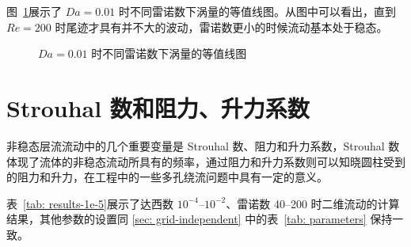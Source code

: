图~\ref{fig: vorticity-contour-1e-2}展示了 $Da=0.01$ 时不同雷诺数下涡量的等值线图。从图中可以看出，直到 $Re=200$ 时尾迹才具有并不大的波动，雷诺数更小的时候流动基本处于稳态。

\begin{figure}
	\centering
	\begin{minipage}{\textwidth}
		\centering
	\end{minipage}
	\centering
	\begin{minipage}{\textwidth}
		\centering
	\end{minipage}
	\caption{$Da=0.01$ 时不同雷诺数下涡量的等值线图}
	\label{fig: vorticity-contour-1e-2}
\end{figure}

\section{Strouhal 数和阻力、升力系数}

非稳态层流流动中的几个重要变量是 Strouhal 数、阻力和升力系数，Strouhal 数体现了流体的非稳态流动所具有的频率，通过阻力和升力系数则可以知晓圆柱受到的阻力和升力，在工程中的一些多孔绕流问题中具有一定的意义。

表~\ref{tab: results-1e-5}展示了达西数 $10^{-4}$--$10^{-2}$、雷诺数 40--200 时二维流动的计算结果，其他参数的设置同 \ref{sec: grid-independent} 中的表~\ref{tab: parameters} 保持一致。

